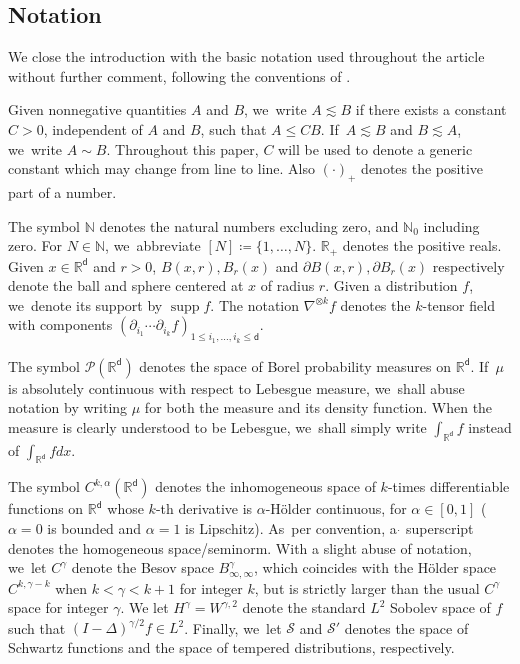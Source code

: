 \documentclass[JEP,XML,SOM,Unicode,published]{cedram}
\theoremstyle{plain}
\theoremstyle{definition}
\DeclareMathOperator{\supp}{supp}
\newcommand{\R}{{\mathbb{R}}}
\newcommand{\N}{{\mathbb{N}}}
\renewcommand{\P}{\mathcal{P}}
\newcommand{\Sc}{{\mathcal{S}}}
\let\al\alpha
\let\ga\gamma
\let\p\partial
\renewcommand{\d}{\mathsf{d}}
\begin{document}
\subsection{Notation}\label{ssec:preN}

We close the introduction with the basic notation used throughout the article without further comment, following the conventions of \cite{RS2022}.

Given nonnegative quantities $A$ and $B$, we~write $A\lesssim B$ if there exists a constant $C>0$, independent of $A$ and $B$, such that $A\leq CB$. If~$A \lesssim B$ and $B\lesssim A$, we~write $A\sim B$. Throughout this paper, $C$ will be used to denote a generic constant which may change from line to line. Also $(\cdot)_+$ denotes the positive part of a number.

The symbol $\N$ denotes the natural numbers excluding zero, and $\N_0$ including zero. {For $N\in\N$, we~abbreviate $[N]\coloneqq \{1,\ldots,N\}$.} $\R_+$ denotes the positive reals. Given $x\in\R^\d$ and $r>0$, $B(x,r), B_r(x)$ and $\p B(x,r), \p B_r(x)$ respectively denote the ball and sphere centered at $x$ of radius $r$. Given a distribution $f$, we~denote its support by $\supp f$. The notation $\nabla^{\otimes k}f$ denotes the $k$-tensor field with components $(\p_{i_1}\cdots\p_{i_k}f)_{1\leq i_1,\ldots,i_k\leq \d}$.

The symbol $\P(\R^\d)$ denotes the space of Borel probability measures on $\R^\d$. If~$\mu$ is absolutely continuous with respect to Lebesgue measure, we~shall abuse notation by writing $\mu$ for both the measure and its density function. When the measure is clearly understood to be Lebesgue, we~shall simply write $\int_{\R^{\d}}f$ instead of $\int_{\R^\d}fdx$.

The symbol $C^{k,\alpha}(\R^\d)$ denotes the inhomogeneous space of $k$-times differentiable functions on $\R^\d$ whose $k$-th derivative is $\alpha$-Hölder continuous, for $\al\in [0,1]$ (\ie $\alpha=0$ is bounded and $\alpha=1$ is Lipschitz). As~per convention, a $\dot{}$ superscript denotes the homogeneous space/seminorm. With a slight abuse of notation, we~let $C^{\ga}$ denote the Besov space $B_{\infty,\infty}^{\ga}$, which coincides with the Hölder space $C^{k,\ga-k}$ when $k<\ga<k+1$ for integer $k$, but is strictly larger than the usual $C^\ga$ space for integer $\ga$. We let $H^{\ga}=W^{\ga,2}$ denote the standard $L^2$ Sobolev space of $f$ such that $(I-\Delta)^{\ga/2}f\in L^2$. Finally, we~let $\Sc$ and $\Sc'$ denotes the space of Schwartz functions and the space of tempered distributions, respectively.
\end{document}
